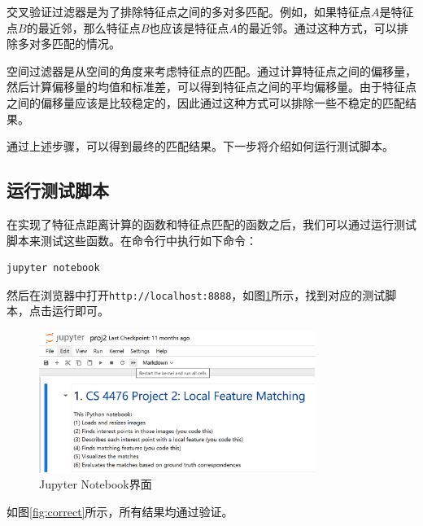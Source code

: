 交叉验证过滤器是为了排除特征点之间的多对多匹配。例如，如果特征点$A$是特征点$B$的最近邻，那么特征点$B$也应该是特征点$A$的最近邻。通过这种方式，可以排除多对多匹配的情况。

空间过滤器是从空间的角度来考虑特征点的匹配。通过计算特征点之间的偏移量，然后计算偏移量的均值和标准差，可以得到特征点之间的平均偏移量。由于特征点之间的偏移量应该是比较稳定的，因此通过这种方式可以排除一些不稳定的匹配结果。

通过上述步骤，可以得到最终的匹配结果。下一步将介绍如何运行测试脚本。

\subsection{运行测试脚本}

在实现了特征点距离计算的函数和特征点匹配的函数之后，我们可以通过运行测试脚本来测试这些函数。在命令行中执行如下命令：

\begin{lstlisting}[language=Bash]
jupyter notebook
\end{lstlisting}

然后在浏览器中打开\texttt{http://localhost:8888}，如图\ref{fig:jupyter}所示，找到对应的测试脚本，点击运行即可。

\begin{figure}[H]
    \centering
    \includegraphics[width=0.8\textwidth]{images/jupyter.png}
    \caption{Jupyter Notebook界面}
    \label{fig:jupyter}
\end{figure}

如图\ref{fig:correct}所示，所有结果均通过验证。

